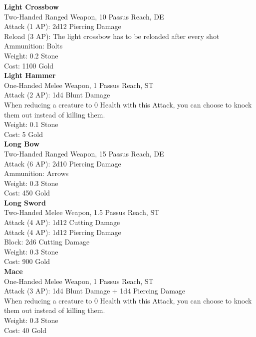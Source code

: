 \textbf{Light Crossbow}\\
Two-Handed Ranged Weapon, 10 Passus Reach, DE\\
Attack (1 AP): 2d12 Piercing Damage\\
Reload (3 AP): The light crossbow has to be reloaded after every shot\\
Ammunition: Bolts\\
Weight: 0.2 Stone\\
Cost: 1100 Gold\\


\textbf{Light Hammer}\\
One-Handed Melee Weapon, 1 Passus Reach, ST\\
Attack (2 AP): 1d4 Blunt Damage\\
When reducing a creature to 0 Health with this Attack, you can choose to knock them out instead of killing them.\\
Weight: 0.1 Stone\\
Cost: 5 Gold\\


\textbf{Long Bow}\\
Two-Handed Ranged Weapon, 15 Passus Reach, DE\\
Attack (6 AP): 2d10 Piercing Damage\\
Ammunition: Arrows\\
Weight: 0.3 Stone\\
Cost: 450 Gold\\


\textbf{Long Sword}\\
Two-Handed Melee Weapon, 1.5 Passus Reach, ST\\
Attack (4 AP): 1d12 Cutting Damage\\
Attack (4 AP): 1d12 Piercing Damage\\
Block: 2d6 Cutting Damage\\
Weight: 0.3 Stone\\
Cost: 900 Gold\\


\textbf{Mace}\\
One-Handed Melee Weapon, 1 Passus Reach, ST\\
Attack (3 AP): 1d4 Blunt Damage + 1d4 Piercing Damage\\
When reducing a creature to 0 Health with this Attack, you can choose to knock them out instead of killing them.\\
Weight: 0.3 Stone\\
Cost: 40 Gold\\


